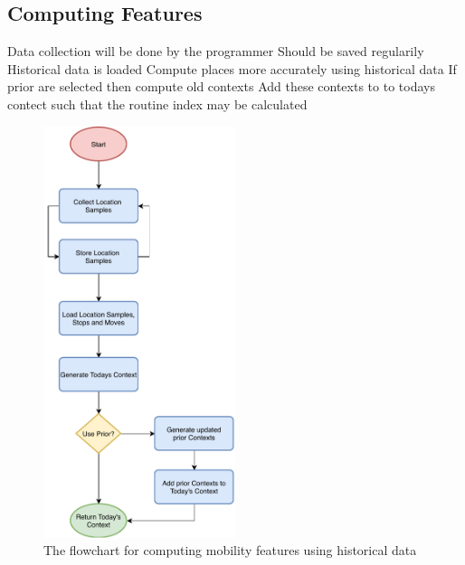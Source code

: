 \subsection{Computing Features}
Data collection will be done by the programmer
Should be saved regularily
Historical data is loaded
Compute places more accurately using historical data
If prior are selected then compute old contexts
Add these contexts to to todays contect such that the routine index may be calculated


\begin{figure}
    \centering
    \includegraphics[width=0.5\textwidth]{images/diagrams/api-flowchart.pdf}
    \caption{The flowchart for computing mobility features using historical data}
    \label{fig:my_label}
\end{figure}


